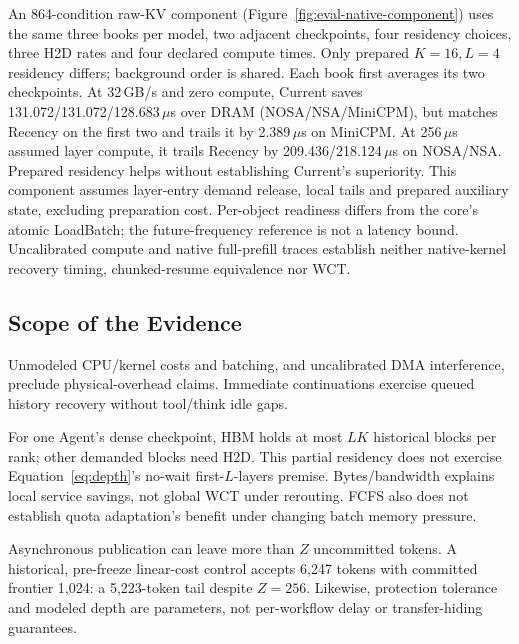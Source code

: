 An 864-condition raw-KV component (Figure~\ref{fig:eval-native-component})
uses the same three books per model,
two adjacent checkpoints, four residency choices, three H2D rates and four
declared compute times. Only prepared $K=16,L=4$ residency differs;
background order is shared. Each book first averages its two checkpoints.
At 32\,GB/s and zero compute, Current saves 131.072/131.072/128.683\,$\mu$s
over DRAM (NOSA/NSA/MiniCPM), but matches Recency on the first two and
trails it by 2.389\,$\mu$s on MiniCPM. At 256\,$\mu$s assumed layer compute,
it trails Recency by 209.436/218.124\,$\mu$s on NOSA/NSA.
Prepared residency helps without establishing Current's superiority.
This component assumes layer-entry demand release, local tails and prepared
auxiliary state, excluding preparation cost. Per-object readiness differs
from the core's atomic LoadBatch; the future-frequency reference is not a
latency bound. Uncalibrated compute and native full-prefill traces establish
neither native-kernel recovery timing, chunked-resume equivalence nor WCT.

\subsection{Scope of the Evidence}
\label{sec:eval-limits}
Unmodeled CPU/kernel costs and batching, and uncalibrated DMA interference,
preclude physical-overhead claims. Immediate continuations exercise queued
history recovery without tool/think idle gaps.

For one Agent's dense checkpoint, HBM holds at most $LK$ historical blocks per
rank; other demanded blocks need H2D. This partial residency does not exercise
Equation~\ref{eq:depth}'s no-wait first-$L$-layers premise. Bytes/bandwidth
explains local service savings, not global WCT under rerouting. FCFS also
does not establish quota adaptation's benefit under changing batch memory pressure.

Asynchronous publication can leave more than $Z$ uncommitted tokens.
A historical, pre-freeze linear-cost control accepts 6,247 tokens with
committed frontier 1,024: a 5,223-token tail despite $Z=256$.
Likewise, protection tolerance and modeled depth are parameters, not
per-workflow delay or transfer-hiding guarantees.
